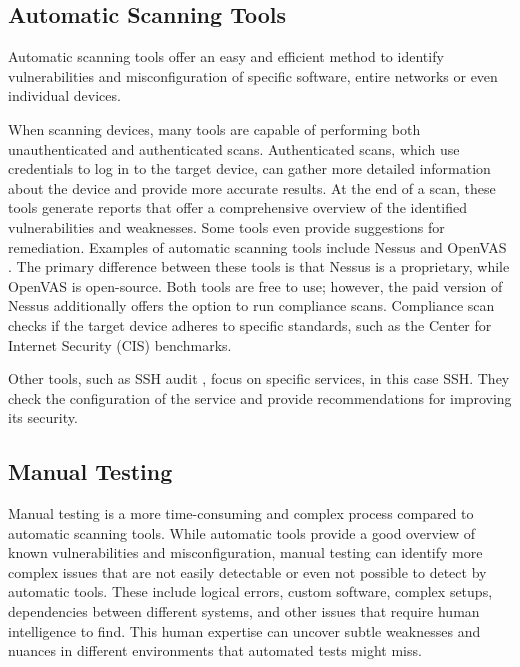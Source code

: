 \subsection{Automatic Scanning Tools}
Automatic scanning tools offer an easy and efficient method to identify vulnerabilities and misconfiguration of specific software, entire networks or even individual devices.

When scanning devices, many tools are capable of performing both unauthenticated and authenticated scans.
Authenticated scans, which use credentials to log in to the target device, can gather more detailed information about the device and provide more accurate results.
At the end of a scan, these tools generate reports that offer a comprehensive overview of the identified vulnerabilities and weaknesses.
Some tools even provide suggestions for remediation.
Examples of automatic scanning tools include Nessus \cite{nessus} and OpenVAS \cite{openvas}.
The primary difference between these tools is that Nessus is a proprietary, while OpenVAS is open-source.
Both tools are free to use; however, the paid version of Nessus additionally offers the option to run compliance scans.
Compliance scan checks if the target device adheres to specific standards, such as the Center for Internet Security (CIS) benchmarks.

Other tools, such as SSH audit \cite{sshaudit}, focus on specific services, in this case SSH.
They check the configuration of the service and provide recommendations for improving its security.


\subsection{Manual Testing}
Manual testing is a more time-consuming and complex process compared to automatic scanning tools.
While automatic tools provide a good overview of known vulnerabilities and misconfiguration, manual testing can identify more complex issues that are not easily detectable or even not possible to detect by automatic tools.
These include logical errors, custom software, complex setups, dependencies between different systems, and other issues that require human intelligence to find.
This human expertise can uncover subtle weaknesses and nuances in different environments that automated tests might miss.

